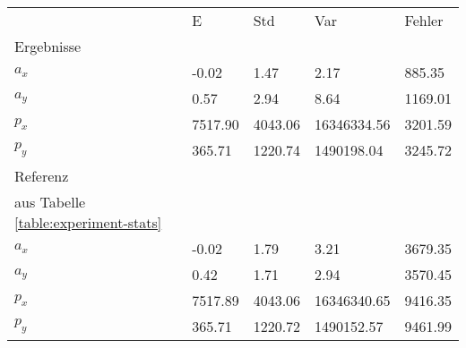 \begin{tabular}{l|l|l|l|l}

     & E   & Std    & Var    & Fehler \\
\hhline{=|=|=|=|=}

Ergebnisse & & & & \\
$a_x$  &        -0.02 &         1.47 &         2.17 &       885.35 \\
$a_y$  &         0.57 &         2.94 &         8.64 &      1169.01 \\
$p_x$  &      7517.90 &      4043.06 &  16346334.56 &      3201.59 \\
$p_y$  &       365.71 &      1220.74 &   1490198.04 &      3245.72 \\

\hline
Referenz & & & & \\
aus Tabelle  \ref{table:experiment-stats} & & & & \\
$a_x$  &        -0.02 &         1.79 &         3.21 &      3679.35 \\
$a_y$  &         0.42 &         1.71 &         2.94 &      3570.45 \\
$p_x$  &      7517.89 &      4043.06 &  16346340.65 &      9416.35 \\
$p_y$  &       365.71 &      1220.72 &   1490152.57 &      9461.99 \\
\end{tabular}
